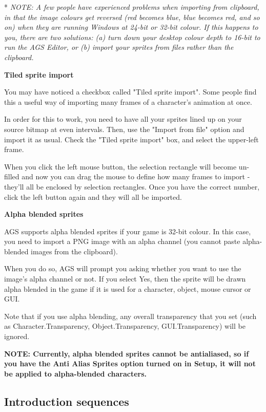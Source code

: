 * \it{NOTE: A few people have experienced problems when importing from clipboard,
in that the image colours get reversed (red becomes blue, blue becomes red, and so on)
when they are running Windows at 24-bit or 32-bit colour. If this happens to you, there
are two solutions: (a) turn down your desktop colour depth to 16-bit to run the AGS Editor,
or (b) import your sprites from files rather than the clipboard.}

\bf{Tiled sprite import}

You may have noticed a checkbox called "Tiled sprite import". Some people find
this a useful way of importing many frames of a character's animation at once.

In order for this to work, you need to have all your sprites lined up on your
source bitmap at even intervals. Then, use the "Import from file" option and import it
as usual. Check the "Tiled sprite import" box, and select the upper-left frame.

When you click the left mouse button, the selection rectangle will become un-filled
and now you can drag the mouse to define how many frames to import - they'll all
be enclosed by selection rectangles. Once you have the correct number, click the left
button again and they will all be imported.

\bf{Alpha blended sprites}

AGS supports alpha blended sprites if your game is 32-bit colour. In this case, you
need to import a PNG image with an alpha channel (you cannot paste alpha-blended
images from the clipboard).

When you do so, AGS will prompt you asking whether you want to use the image's alpha
channel or not. If you select Yes, then the sprite will be drawn alpha blended in
the game if it is used for a character, object, mouse cursor or GUI.

Note that if you use alpha blending, any overall transparency that you set (such
as Character.Transparency, Object.Transparency, GUI.Transparency) will be ignored.

\bf{NOTE:} Currently, alpha blended sprites cannot be antialiased, so if you have
the Anti Alias Sprites option turned on in Setup, it will not be applied to alpha-blended
characters.

\subsection{Introduction sequences}%

